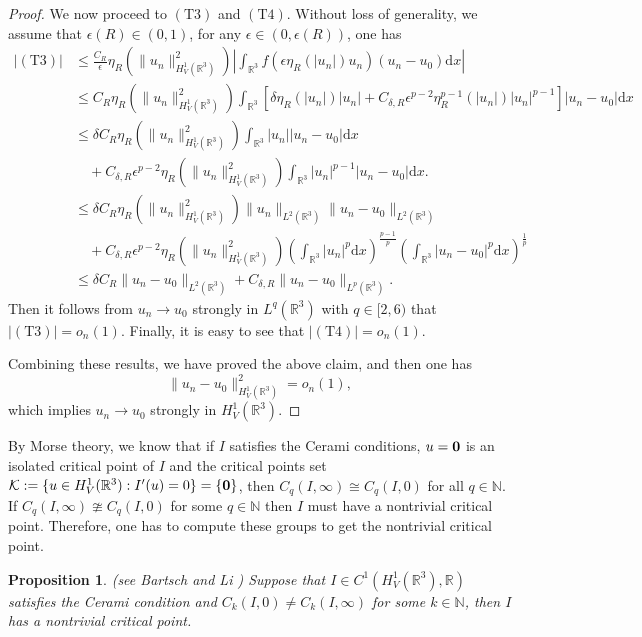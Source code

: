 \documentclass[12pt]{amsart}
\numberwithin{equation}{section}
\newtheorem{proposition}[theorem]{Proposition}
\theoremstyle{definition}
\begin{document}
\begin{proof}
We now proceed to $(\text{T}3)$ and $(\text{T}4)$. Without loss of generality, we assume that $\epsilon(R)\in(0,1)$, for any $\epsilon\in(0,\epsilon(R))$, one has
\begin{equation*}
    \begin{aligned}
         \left |(\text{T}3)\right |&\leq   \frac{C_{R}}{\epsilon} \eta_R(\|u_n\|_{H^1_V(\mathbb{R}^3)}^2) \left|\int_{\mathbb{R}^3} f(\epsilon \eta_R(|u_n|) u_n) (u_n - u_0) \text{d}x\right|\\
    &\leq   C_{R}\eta_R(\|u_n\|_{H^1_V(\mathbb{R}^3)}^2) \int_{\mathbb{R}^3} \left [ \delta \eta _{R}\left ( \left | u_{n}\right | \right )|u_{n}|+C_{\delta,R } \epsilon^{p-2}\eta _{R}^{p-1}\left ( \left | u_{n}\right |\right )|u_{n}| ^{p-1}\right ]|u_n - u_0|\text{d}x\\
    &\leq\delta C_{R}\eta_R(\|u_n\|_{H^1_V(\mathbb{R}^3)}^2)   \int_{\mathbb{R}^3}|u_{n}||u_{n}-u_{0} |\text{d}x\\
    &\quad+ C_{\delta ,R}\epsilon^{p-2}\eta_R(\|u_n\|_{H^1_V(\mathbb{R}^3)}^2) \int_{\mathbb{R}^3}|u_{n}|^{p-1}|u_{n}-u_{0}|\text{d}x.\\
    &\leq \delta C_{R}\eta_R(\|u_n\|_{H^1_V(\mathbb{R}^3)}^2) \|u_n\|_{L^{2}(\mathbb{R}^3)}\|u_n-u_0\|_{L^{2}(\mathbb{R}^3)}\\
    &\quad+C_{\delta ,R}\epsilon^{p-2}\eta_R(\|u_n\|_{H^1_V(\mathbb{R}^3)}^2) \left ( \int_{\mathbb{R}^3}|u_{n}|^{p} \text{d}x\right )^{\frac{p-1}{p}}\left ( \int_{\mathbb{R}^3}\left | u_{n}-u_{0}\right |^{p}\text{d}x \right )^{\frac{1}{p}}\\
    &\leq \delta C_{R}\|u_n-u_0\|_{L^{2}(\mathbb{R}^3)}+C_{\delta ,R}\|u_n-u_0\|_{L^{p}(\mathbb{R}^3)}.
    \end{aligned}
\end{equation*}
Then it follows from $u_n\to u_0$ strongly in $L^{q}(\mathbb{R}^3)$ with $q\in[2,6)$ that $|(\text{T}3)|=o_{n}\left ( 1 \right ).$ Finally, it is easy to see that $|(\text{T}4)|=o_{n}\left ( 1 \right ).$

Combining these results, we have proved the above claim, and then one has
\begin{equation*}
    \|u_n - u_0\|_{H^1_V(\mathbb{R}^3)}^2=o_{n}\left ( 1 \right ),
\end{equation*}
which implies $u_{n} \to u _{0}$ strongly in $H_{V}^{1}\left ( \mathbb{R}^{3} \right )$.
\end{proof}
By Morse theory, we know that if $I$ satisfies the Cerami conditions, $u={\bf 0}$ is an isolated critical point of $I$ and the critical points set $\mathcal{K}:=\{u\in H^{1}_{V}(\mathbb{R}^3):I'(u)=0\}=\{\bf 0\}$, then $C_{q}(I,\infty)\cong C_{q}(I,0)$ for all $q\in \mathbb{N}$. If $C_{q}(I,\infty)\ncong C_{q}(I,0)$ for some $q\in \mathbb{N}$ then $I$ must have a nontrivial critical point. Therefore, one has to compute these groups to get the nontrivial critical point.
\begin{proposition}\label{pro1}(see  Bartsch and  Li \cite{MR1420790})
Suppose that $I\in C^{1}(H^{1}_{V}(\mathbb{R}^3),\mathbb{R})$ satisfies the Cerami condition and $C_{k}(I,0)\neq C_{k}(I,\infty)$ for some $k\in\mathbb{N}$, then $I$ has a nontrivial critical point.
\end{proposition}
\end{document}
